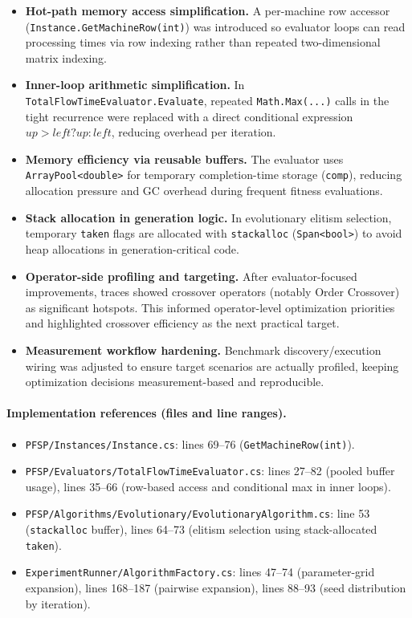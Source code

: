 \documentclass[12pt,a4paper]{report}
\begin{document}
\begin{itemize}
    \item \textbf{Hot-path memory access simplification.} A per-machine row accessor
    (\texttt{Instance.GetMachineRow(int)}) was introduced so evaluator loops can read processing times via row
    indexing rather than repeated two-dimensional matrix indexing.

    \item \textbf{Inner-loop arithmetic simplification.} In
    \texttt{TotalFlowTimeEvaluator.Evaluate}, repeated \texttt{Math.Max(...)} calls in the tight recurrence were
    replaced with a direct conditional expression \(up > left ? up : left\), reducing overhead per iteration.

    \item \textbf{Memory efficiency via reusable buffers.} The evaluator uses
    \texttt{ArrayPool<double>} for temporary completion-time storage (\texttt{comp}), reducing allocation pressure
    and GC overhead during frequent fitness evaluations.

    \item \textbf{Stack allocation in generation logic.} In evolutionary elitism selection,
    temporary \texttt{taken} flags are allocated with \texttt{stackalloc} (\texttt{Span<bool>}) to avoid heap
    allocations in generation-critical code.

    \item \textbf{Operator-side profiling and targeting.} After evaluator-focused improvements,
    traces showed crossover operators (notably Order Crossover) as significant hotspots. This informed operator-level
    optimization priorities and highlighted crossover efficiency as the next practical target.

    \item \textbf{Measurement workflow hardening.} Benchmark discovery/execution wiring was adjusted to ensure
    target scenarios are actually profiled, keeping optimization decisions measurement-based and reproducible.
\end{itemize}

\paragraph{Implementation references (files and line ranges).}
\begin{itemize}
    \item \texttt{PFSP/Instances/Instance.cs}: lines 69--76 (\texttt{GetMachineRow(int)}).
    \item \texttt{PFSP/Evaluators/TotalFlowTimeEvaluator.cs}: lines 27--82 (pooled buffer usage),
    lines 35--66 (row-based access and conditional max in inner loops).
    \item \texttt{PFSP/Algorithms/Evolutionary/EvolutionaryAlgorithm.cs}: line 53 (\texttt{stackalloc} buffer),
    lines 64--73 (elitism selection using stack-allocated \texttt{taken}).
    \item \texttt{ExperimentRunner/AlgorithmFactory.cs}: lines 47--74 (parameter-grid expansion),
    lines 168--187 (pairwise expansion), lines 88--93 (seed distribution by iteration).
\end{itemize}
\end{document}
